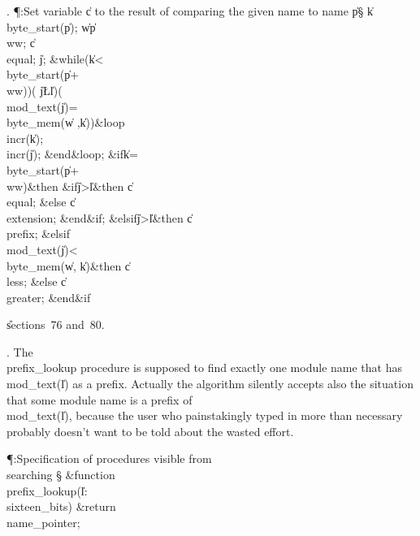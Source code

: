 . \P\?:Set variable \|c to the result of comparing the given name to
name \|p\X\S\?\6
\|k\?\K\?\\{byte\_start}\?\1(\?\|p\?\2)\?;\5
\|w\?\K\?\|p\?\?\\{ww};\5
\|c\?\K\?\\{equal};\5
\|j\?\K{};\6
\1\&{while}\?\8\1(\?\|k\?<\?\\{byte\_start}\?\1(\?\|p\?+\?\\{ww}\?\2)\2)\W\1(\?%
\|j\?\L\?\|l\?\2)\W\1(\?\\{mod\_text}\?\1(\?\|j\?\2)=\?\\{byte\_mem}\?\1(\?\|w%
\?,\?\|k\?\2)\2)\?\8\&{loop}\6
\\{incr}\?\1(\?\|k\?\2)\?;\5
\\{incr}\?\1(\?\|j\?\2)\?;\2\6
\&{end}\8\&{loop};\6
\&{if}\1\1\8\|k\?=\?\\{byte\_start}\?\1(\?\|p\?+\?\\{ww}\?\2)\?\2\8\&{then}\6
\&{if}\1\1\8\|j\?>\?\|l\2\8\&{then}\6
\|c\?\K\?\\{equal};\6
\4\&{else}\6
\|c\?\K\?\\{extension};\2\6
\&{end}\8\2\&{if}\1;\6
\4\&{elsif}\1\8\|j\?>\?\|l\2\8\&{then}\6
\|c\?\K\?\\{prefix};\6
\4\&{elsif}\1\8\\{mod\_text}\?\1(\?\|j\?\2)<\?\\{byte\_mem}\?\1(\?\|w\?,\?%
\|k\?\2)\?\2\8\&{then}\6
\|c\?\K\?\\{less};\6
\4\&{else}\6
\|c\?\K\?\\{greater};\2\6
\&{end}\8\2\&{if}\1\par
\U sections~76 and~80.\fi

. The \\{prefix\_lookup} procedure is supposed to find exactly one module
name that has \\{mod\_text}\?(\?\to\?\|l\?)\? as a prefix. Actually the
algorithm silently
accepts also the situation that some module name is a prefix of
\\{mod\_text}\?(\?\to\?\|l\?)\?, because the user who painstakingly typed in
more than
necessary probably doesn't want to be told about the wasted effort.

\Y\P\?\4:Specification of procedures visible from \\{searching}\X%
\mathrel{+}\S\?\6
\&{function}\8\1\\{prefix\_lookup}\?(\1\?\|l\?:\?\\{sixteen\_bits}\?\2)%
\&{return}\?\8\\{name\_pointer}\2;\par
\fi

